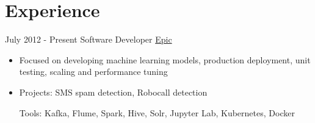 \documentclass[letterpaper]{twentysecondcv} %
\begin{document}
\makeprofile %


\section{Experience}

\begin{twenty} %
\twentyitem
    	{July 2012 -}
		{Present}
        {Software Developer}
        {\href{https://www.epic.com/}{Epic}}
        {}
        {\begin{itemize}
MORE HERE
        \item Focused on developing machine learning models, production deployment,  unit testing, scaling and performance tuning
        \item Projects: SMS spam detection, Robocall detection 
        
        Tools: Kafka, Flume, Spark, Hive, Solr, Jupyter Lab, Kubernetes, Docker
        

\end{itemize}}
\end{twenty}
\end{document}
